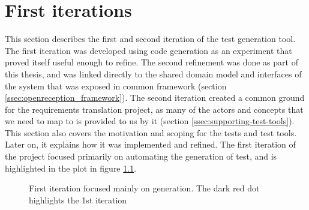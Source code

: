 \chapter{First iterations}
This section describes the first and second iteration of the test generation tool. The first iteration was developed using code generation as an experiment that proved itself useful enough to refine. The second refinement was done as part of this thesis, and was linked directly to the shared domain model and interfaces of the system that was exposed in common framework (section \ref{ssec:openreception_framework}). The second iteration created a common ground for the requirements translation project, as many of the actors and concepts that we need to map to is provided to us by it (section \ref{ssec:supporting-test-tools}).\\
This section also covers the motivation and scoping for the tests and test tools. Later on, it explains how it was implemented and refined. The first iteration of the project focused primarily on automating the generation of test, and is highlighted in the plot in figure \ref{fig:project_parameter_plot_1st_iteration}.
\begin{figure}[!htbp]
\centering
{}
\caption{First iteration focused mainly on generation. The dark red dot highlights the 1st iteration}
\label{fig:project_parameter_plot_1st_iteration}
\end{figure}

